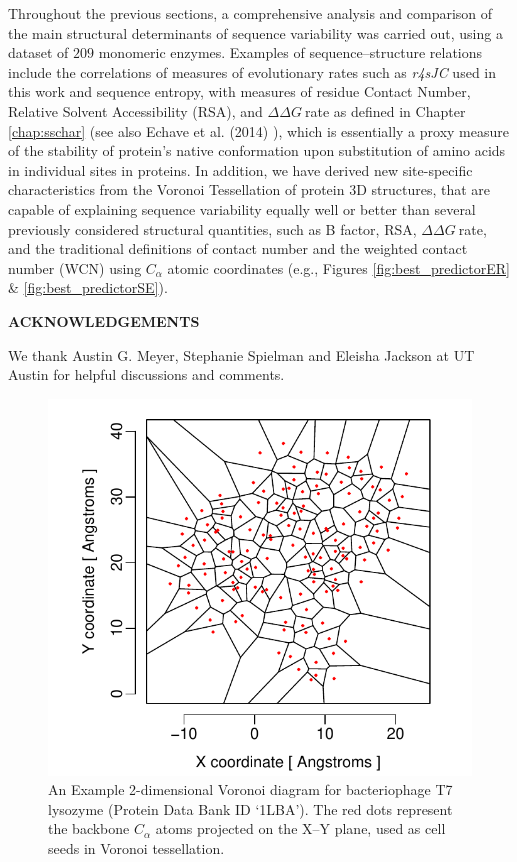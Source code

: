 \documentclass[11pt]{article}
\newcommand{\ddg}{$\Delta\Delta G~$}
\def\Acknowledgements{\bigskip  \bigskip \begin{center} \begin{large}
             \bf ACKNOWLEDGEMENTS \end{large}\end{center}}
\begin{document}
    Throughout the previous sections,  a comprehensive analysis and comparison of the main structural determinants of sequence variability was carried out, using a dataset of $209$ monomeric enzymes. Examples of sequence--structure relations include the correlations of measures of evolutionary rates such as {\it r4sJC} used in this work and sequence entropy, with measures of residue Contact Number, Relative Solvent Accessibility (RSA), and \ddg rate as defined in Chapter \ref{chap:sschar} (see also Echave et al. (2014) \cite{echave_relationship_2014}), which is essentially a proxy measure of the stability of protein's native conformation upon substitution of amino acids in individual sites in proteins. In addition, we have derived new site-specific characteristics from the Voronoi Tessellation of protein 3D structures, that are capable of explaining sequence variability equally well or better than several previously considered structural quantities, such as B factor, RSA, \ddg rate, and the traditional definitions of contact number and the weighted contact number (WCN) using $C_\alpha$ atomic coordinates (e.g., Figures \ref{fig:best_predictorER} \& \ref{fig:best_predictorSE}).

\Acknowledgements

We thank Austin G. Meyer, Stephanie Spielman and Eleisha Jackson at UT Austin for helpful discussions and comments.





\newpage

    \begin{figure}
        \begin{center}
        \includegraphics[width=6in]{voronoi_diagram.pdf}
        \end{center}
        \caption{An Example 2-dimensional Voronoi diagram for bacteriophage T7 lysozyme (Protein Data Bank ID `1LBA'). The red dots represent the backbone $C_\alpha$ atoms projected on the X--Y plane, used as cell seeds in Voronoi tessellation.}
        \label{fig:voronoi}
    \end{figure}
\end{document}
